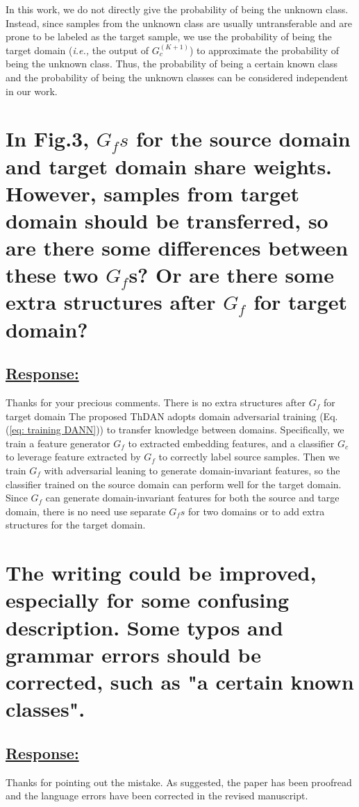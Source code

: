 In this work, we do not directly give the probability of being the unknown class. 
Instead, since samples from the unknown class are usually untransferable and are prone to be labeled as the target sample, we use the probability of being the target domain (\textit{i.e.,} the output of $G_c^(K+1)$) to approximate the probability of being the unknown class. 
Thus, the probability of being a certain known class and the probability of being the unknown classes can be considered independent in our work. 

\section{In Fig.3, $G_fs$ for the source domain and target domain share weights. 
However, samples from target domain should be transferred, so are there some differences between these two $G_f$s? 
Or are there some extra structures after $G_f$ for target domain?}
\subsection*{\underline{\textbf{Response:}}}

Thanks for your precious comments. 
There is no extra structures after $G_f$ for target domain
The proposed ThDAN adopts domain adversarial training (Eq.(\ref{eq: training DANN})) to transfer knowledge between domains.
Specifically, we train a feature generator $G_f$ to extracted embedding features, and a classifier $G_c$ to leverage feature extracted by $G_f$ to correctly label source samples.
Then we train $G_f$ with adversarial leaning to generate domain-invariant features, so the classifier trained on the source domain can perform well for the target domain.
Since $G_f$ can generate domain-invariant features for both the source and targe domain, there is no need use separate $G_fs$ for two domains or to add extra structures for the target domain. 

\section{The writing could be improved, especially for some confusing description. 
Some typos and grammar errors should be corrected, such as "a certain known classes".}

\subsection*{\underline{\textbf{Response:}}}

Thanks for pointing out the mistake. 
As suggested, the paper has been proofread and the language errors have been corrected in the revised manuscript.
